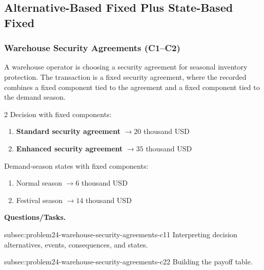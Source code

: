 

	\subsection{Alternative-Based Fixed Plus State-Based Fixed}
	\label{sec:alternative-based-fixed-payoff-plus-state-based-fixed-payoff}


	\subsubsection{Warehouse Security Agreements (C1--C2)}
	\label{sec:problem24-warehouse-security-agreements-c1-c2}
	A warehouse operator is choosing a security agreement for seasonal inventory protection. The transaction is a fixed security agreement, where the recorded  combines a fixed component tied to the agreement and a fixed component tied to the demand season.

	\begin{multicols}{2}
		Decision  with fixed  components:
		\begin{enumerate}[label=\arabic*.]
			\item \textbf{Standard security agreement} $\to 20$ thousand USD
			\item \textbf{Enhanced security agreement} $\to 35$ thousand USD
		\end{enumerate}

			\columnbreak

		Demand-season states with fixed  components:
		\begin{enumerate}[label=\arabic*.]
			\item Normal season $\to 6$ thousand USD
			\item Festival season $\to 14$ thousand USD
		\end{enumerate}
	\end{multicols}

	\textbf{Questions/Tasks.}
	\begin{enumerate}
		\CriterionTask
		{subsec:problem24-warehouse-security-agreements-c1}{1}
		{Interpreting decision alternatives, events, consequences, and states.}

		\CriterionTask
		{subsec:problem24-warehouse-security-agreements-c2}{2}
		{Building the payoff table.}
	\end{enumerate}

